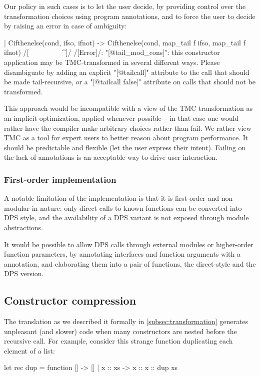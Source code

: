Our policy in such cases is to let the user decide, by providing
control over the transformation choices using \ocaml{[@tailcall]}
program annotations, and to force the user to decide by raising an
error in case of ambiguity:
\begin{Ocaml}
  | Cifthenelse(cond, ifso, ifnot) ->
      Cifthenelse(cond, map_tail f ifso, map_tail f ifnot)
      /[^^^^^^^^^^^^^^^^^^^^^^^^^^^^^^^^^^^^^^^^^^^^^^^^^^^^]/
/[Error]/: "[@tail_mod_cons]": this constructor application may be TMC-transformed
       in several different ways. Please disambiguate by adding an explicit
       "[@tailcall]" attribute to the call that should be made tail-recursive,
       or a "[@tailcall false]" attribute on calls that should not be
       transformed.
\end{Ocaml}

This approach would be incompatible with a view of the TMC
transformation as an implicit optimization, applied whenever
possible -- in that case one would rather have the compiler make
arbitrary choices rather than fail. We rather view TMC as a tool for
expert users to better reason about program performance. It should be
predictable and flexible (let the user express
their intent). Failing on the lack of annotations is an acceptable way
to drive user interaction.

\subsubsection{First-order implementation} A notable limitation of the
\OCaml implementation is that it is first-order and non-modular in
nature: only direct calls to known functions can be converted into DPS
style, and the availability of a DPS variant is not exposed through
module abstractions.

It would be possible to allow DPS calls through external modules or
higher-order function parameters, by annotating interfaces and
function arguments with a  annotation, and
elaborating them into a pair of functions, the direct-style and the DPS
version.

\subsection{Constructor compression} \label{subsec:constructor-compression} The translation as we described it formally in \cref{subsec:transformation} generates unpleasant (and slower) code when many constructors are nested before the recursive call. For example, consider this strange function duplicating each element of a list:
\begin{Ocaml}
let rec dup = function [] -> [] | x :: xs -> x :: x :: dup xs
\end{Ocaml}

